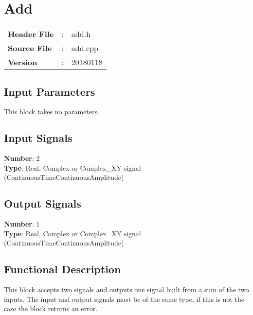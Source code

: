\clearpage

\section{Add}

\begin{tcolorbox}	
\begin{tabular}{p{2.75cm} p{0.2cm} p{10.5cm}} 	
\textbf{Header File}   &:& add.h \\
\textbf{Source File}   &:& add.cpp \\
\textbf{Version}       &:& 20180118
\end{tabular}
\end{tcolorbox}

\subsection*{Input Parameters}

This block takes no parameters.

\subsection*{Input Signals}

\textbf{Number}: 2\\
\textbf{Type}: Real, Complex or Complex\_XY signal (ContinuousTimeContinuousAmplitude)

\subsection*{Output Signals}

\textbf{Number}: 1\\
\textbf{Type}: Real, Complex or Complex\_XY signal (ContinuousTimeContinuousAmplitude)

\subsection*{Functional Description}

This block accepts two signals and outputs one signal built from a sum of the two inputs. The input and output signals must be of the same type, if this is not the case the block returns an error.

%
